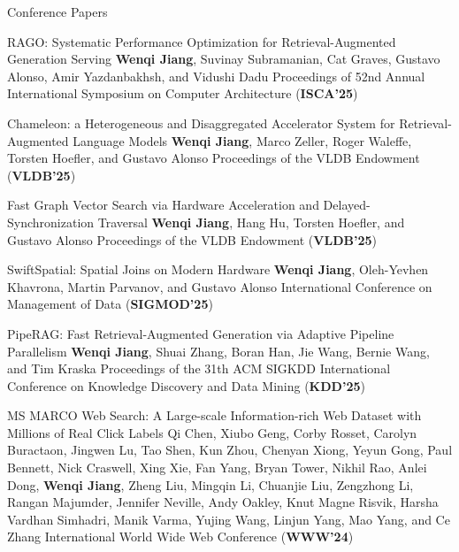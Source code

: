

\begin{rSection}{Conference Papers}
\begin{enumerate}[label={[\arabic*]}]

\item 
\begin{Pub}{RAGO: Systematic Performance Optimization for Retrieval-Augmented Generation Serving}
{\textbf{Wenqi Jiang}, Suvinay Subramanian, Cat Graves, Gustavo Alonso, Amir Yazdanbakhsh, and Vidushi Dadu}
{Proceedings of 52nd Annual International Symposium on Computer Architecture (\textbf{ISCA'25})}
\end{Pub}

\item 
\begin{Pub}{Chameleon: a Heterogeneous and Disaggregated Accelerator System for Retrieval-Augmented Language Models}
{\textbf{Wenqi Jiang}, Marco Zeller, Roger Waleffe, Torsten Hoefler, and Gustavo Alonso}
{Proceedings of the VLDB Endowment (\textbf{VLDB'25})}
\end{Pub}

\item 
\begin{Pub}{Fast Graph Vector Search via Hardware Acceleration and Delayed-Synchronization Traversal}
{\textbf{Wenqi Jiang}, Hang Hu, Torsten Hoefler, and Gustavo Alonso}
{Proceedings of the VLDB Endowment (\textbf{VLDB'25})}
\end{Pub}

\item 
\begin{Pub}{SwiftSpatial: Spatial Joins on Modern Hardware}
{\textbf{Wenqi Jiang}, Oleh-Yevhen Khavrona, Martin Parvanov, and Gustavo Alonso}
{International Conference on Management of Data (\textbf{SIGMOD'25})}
\end{Pub}

\item 
\begin{Pub}{PipeRAG: Fast Retrieval-Augmented Generation via Adaptive Pipeline Parallelism}
{\textbf{Wenqi Jiang}, Shuai Zhang, Boran Han, Jie Wang, Bernie Wang, and Tim Kraska}
{Proceedings of the 31th ACM SIGKDD International Conference on Knowledge Discovery and Data Mining (\textbf{KDD'25})}
\end{Pub}

\item 
\begin{Pub}{MS MARCO Web Search: A Large-scale Information-rich Web Dataset with Millions of Real Click Labels}
{Qi Chen, Xiubo Geng, Corby Rosset, Carolyn Buractaon, Jingwen Lu, Tao Shen, Kun Zhou, Chenyan Xiong, Yeyun Gong, Paul Bennett, Nick Craswell, Xing Xie, Fan Yang, Bryan Tower, Nikhil Rao, Anlei Dong, \textbf{Wenqi Jiang}, Zheng Liu, Mingqin Li, Chuanjie Liu, Zengzhong Li, Rangan Majumder, Jennifer Neville, Andy Oakley, Knut Magne Risvik, Harsha Vardhan Simhadri, Manik Varma, Yujing Wang, Linjun Yang, Mao Yang, and Ce Zhang}
{International World Wide Web Conference (\textbf{WWW'24})}
\end{Pub}


\end{enumerate}
\end{rSection}

